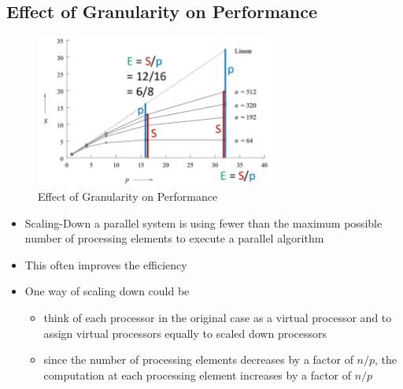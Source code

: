 \hypertarget{effect-of-granularity-on-performance}{%
\subsection{Effect of Granularity on
Performance}\label{effect-of-granularity-on-performance}}

\begin{figure}[H]
\centering
\includegraphics[width=0.7\textwidth]{figures/granularityOnPerformance.png}
\caption{Effect of Granularity on Performance}
\end{figure}

\begin{itemize}
\tightlist
\item
  Scaling-Down a parallel system is using fewer than the maximum
  possible number of processing elements to execute a parallel algorithm
\item
  This often improves the efficiency
\item
  One way of scaling down could be

  \begin{itemize}
  \tightlist
  \item
    think of each processor in the original case as a virtual processor
    and to assign virtual processors equally to scaled down processors
  \item
    since the number of processing elements decreases by a factor of
    $n/p$, the computation at each processing element increases by a
    factor of $n/p$
  \end{itemize}
\end{itemize}

\clearpage